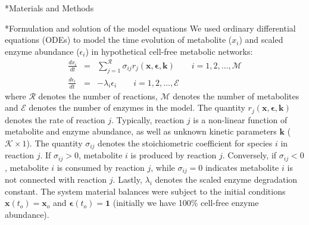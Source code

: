 \documentclass[12pt]{article}
\makeatletter
\renewcommand\subsection{\@startsection
	{subsection}{2}{0mm}
	{-0.05in}
	{-0.5\baselineskip}
	{\normalfont\normalsize\bfseries}}
\renewcommand\section{\@startsection
	{subsection}{2}{0mm}
	{-0.2in}
	{0.05\baselineskip}
	{\normalfont\large\bfseries}}
\makeatother
\begin{document}
\clearpage

\section*{Materials and Methods}

\subsection*{Formulation and solution of the model equations}
We used ordinary differential equations (ODEs) to model the time evolution of metabolite ($x_{i}$) and scaled enzyme abundance ($\epsilon_{i}$) in hypothetical cell-free metabolic networks:
\begin{eqnarray}
	\frac{dx_{i}}{dt} & = & \sum_{j=1}^{\mathcal{R}}\sigma_{ij}r_{j}\left(\mathbf{x},\mathbf{\epsilon},\mathbf{k}\right)\qquad{i=1,2,\hdots,\mathcal{M}}\\
	\frac{d\epsilon_{i}}{dt} & = & -\lambda_{i}\epsilon_{i}\qquad{i=1,2,\hdots,\mathcal{E}}
\end{eqnarray}where $\mathcal{R}$ denotes the number of reactions, $\mathcal{M}$ denotes the number of metabolites and $\mathcal{E}$ denotes the number of enzymes in the model.
The quantity $r_{j}\left(\mathbf{x},\mathbf{\epsilon},\mathbf{k}\right)$ denotes the rate of reaction $j$.
Typically, reaction $j$ is a non-linear function of metabolite and enzyme abundance, as well as unknown kinetic parameters $\mathbf{k}$ ($\mathcal{K}\times{1}$).
The quantity $\sigma_{ij}$ denotes the stoichiometric coefficient for species $i$ in reaction $j$.
If $\sigma_{ij}>0$, metabolite $i$ is produced by reaction $j$.
Conversely, if $\sigma_{ij}<0$, metabolite $i$ is consumed by reaction $j$, while $\sigma_{ij}=0$ indicates metabolite $i$ is not connected with reaction $j$.
Lastly, $\lambda_{i}$ denotes the scaled enzyme degradation constant.
The system material balances were subject to the initial conditions $\mathbf{x}\left(t_{o}\right)=\mathbf{x}_{o}$ and $\mathbf{\epsilon}\left(t_{o}\right)=\mathbf{1}$ (initially we have 100\% cell-free enzyme abundance).
\end{document}
